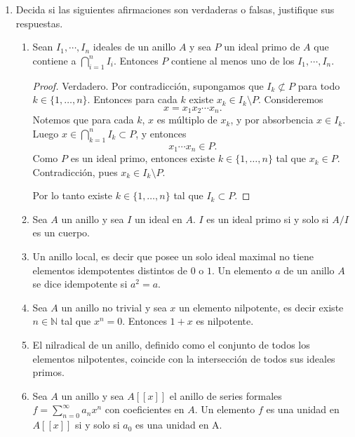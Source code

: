 \documentclass{article}
\theoremstyle{definition}
\theoremstyle{remark}
\numberwithin{equation}{section}
\begin{document}
\begin{enumerate}
    
\item Decida si las siguientes afirmaciones son verdaderas o falsas, justifique sus respuestas.
\begin{enumerate}

\item Sean $I_1, \cdots , I_n$ ideales de un anillo $A$ y sea $P$ un ideal primo de $A$ que contiene a $\bigcap_{i=1}^{n} I_i$. Entonces $P$ contiene al menos uno de los $I_1, \cdots , I_n$.
\begin{proof}
  Verdadero. Por contradicción, supongamos que $I_k \not\subset P$ para todo $k \in \{1,\dots,n\}$. Entonces para cada $k$ existe $x_k \in I_k \setminus P$. Consideremos 
  \[ x = x_1 x_2 \cdots x_n. \]
  Notemos que para cada $k$, $x$ es múltiplo de $x_k$, y por absorbencia $x \in I_k$. Luego $x \in \bigcap_{k=1}^n I_k \subset P$, y entonces 
  \[ x_1 \cdots x_n \in P. \]
  Como $P$ es un ideal primo, entonces existe $k \in \{1,\dots,n\}$ tal que $x_k \in P$. Contradicción, pues $x_k \in I_k \setminus P$.

  Por lo tanto existe $k \in \{1,\dots,n\}$ tal que $I_k \subset P$.
\end{proof}

\item Sea $A$ un anillo y sea $I$ un ideal en $A$. $I$ es un ideal primo si y solo si $A/I$ es un cuerpo.

\item Un anillo local, es decir que posee un solo ideal maximal no tiene elementos idempotentes distintos de $0$ o $1$. Un elemento $a$ de un anillo $A$ se dice idempotente si $a^2=a$.


\item Sea $A$ un anillo no trivial y sea $x$ un elemento nilpotente, es decir existe $n \in \mathbb{N}$ tal que $x^n =0$. Entonces $1+x$ es nilpotente. 

\item El nilradical de un anillo, definido como el conjunto de todos los elementos nilpotentes, coincide con la intersección de todos sus ideales primos.

\item Sea $A$ un anillo y sea $A[[x]]$ el anillo de series formales $f=\sum_{n=0}^\infty a_nx^n$ con coeficientes en $A$. Un elemento $f$ es una unidad en $A[[x]]$ si y solo si $a_0$ es una unidad en A.
\end{enumerate}


\end{enumerate}
\end{document}
